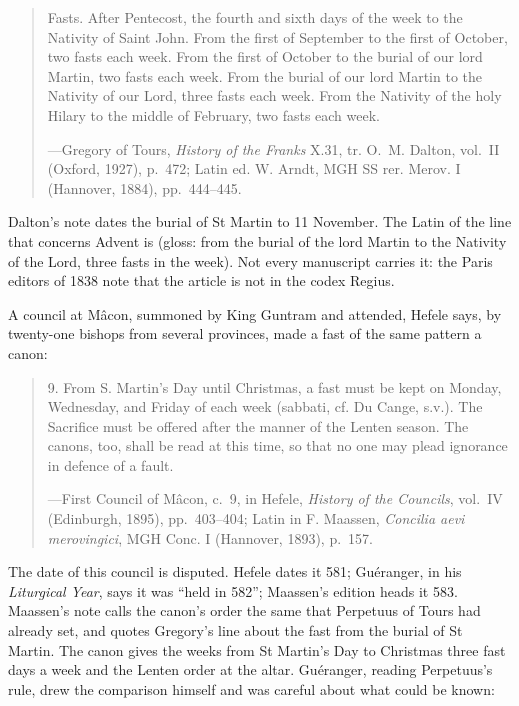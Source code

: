 \begin{quote}
Fasts. After Pentecost, the fourth and sixth days of the week to the Nativity of Saint John. From
the first of September to the first of October, two fasts each week. From the first of October
to the burial of our lord Martin, two fasts each week. From the burial of our lord Martin to the
Nativity of our Lord, three fasts each week. From the Nativity of the holy Hilary to the middle
of February, two fasts each week.\par
{\smallskip\noindent\small ---Gregory of Tours, \textit{History of the Franks} X.31, tr. O.~M.
Dalton, vol.~II (Oxford, 1927), p.~472; Latin ed. W. Arndt, MGH SS rer. Merov. I (Hannover,
1884), pp.~444--445.\par}
\end{quote}

Dalton's note dates the burial of St Martin to 11 November. The Latin of the line that concerns
Advent is 
(gloss: from the burial of the lord Martin to the Nativity of the Lord, three fasts in the
week). Not every manuscript carries it: the Paris editors of 1838 note that the article is not in
the codex Regius.

A council at Mâcon, summoned by King Guntram and attended, Hefele says, by twenty-one bishops
from several provinces, made a fast of the same pattern a canon:

\begin{quote}
9. From S. Martin's Day until Christmas, a fast must be kept on Monday, Wednesday, and Friday of
each week (sabbati, cf. Du Cange, s.v.). The Sacrifice must be offered after the manner of the
Lenten season. The canons, too, shall be read at this time, so that no one may plead ignorance
in defence of a fault.\par
{\smallskip\noindent\small ---First Council of Mâcon, c.~9, in Hefele, \textit{History of the
Councils}, vol.~IV (Edinburgh, 1895), pp.~403--404; Latin in F. Maassen, \textit{Concilia aevi
merovingici}, MGH Conc. I (Hannover, 1893), p.~157.\par}
\end{quote}

The date of this council is disputed. Hefele dates it 581; Guéranger, in his \textit{Liturgical
Year}, says it was ``held in 582''; Maassen's edition heads it 583. Maassen's note calls the canon's order the same
that Perpetuus of Tours had already set, and quotes Gregory's line about the fast from the burial
of St Martin. The canon gives the weeks from St Martin's Day to Christmas three fast days a week
and the Lenten order at the altar. Guéranger, reading Perpetuus's rule, drew the comparison
himself and was careful about what could be known:

